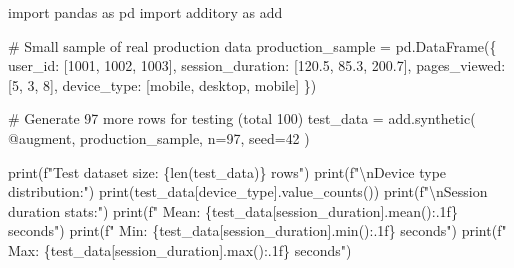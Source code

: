 \documentclass[
  letterpaper,
]{scrbook}
\newenvironment{Shaded}{\begin{snugshade}}{\end{snugshade}}
\newcommand{\BuiltInTok}[1]{\textcolor[rgb]{0.00,0.23,0.31}{#1}}
\newcommand{\CharTok}[1]{\textcolor[rgb]{0.13,0.47,0.30}{#1}}
\newcommand{\CommentTok}[1]{\textcolor[rgb]{0.37,0.37,0.37}{#1}}
\newcommand{\DecValTok}[1]{\textcolor[rgb]{0.68,0.00,0.00}{#1}}
\newcommand{\FloatTok}[1]{\textcolor[rgb]{0.68,0.00,0.00}{#1}}
\newcommand{\ImportTok}[1]{\textcolor[rgb]{0.00,0.46,0.62}{#1}}
\newcommand{\NormalTok}[1]{\textcolor[rgb]{0.00,0.23,0.31}{#1}}
\newcommand{\OperatorTok}[1]{\textcolor[rgb]{0.37,0.37,0.37}{#1}}
\newcommand{\SpecialCharTok}[1]{\textcolor[rgb]{0.37,0.37,0.37}{#1}}
\newcommand{\SpecialStringTok}[1]{\textcolor[rgb]{0.13,0.47,0.30}{#1}}
\newcommand{\StringTok}[1]{\textcolor[rgb]{0.13,0.47,0.30}{#1}}
\begin{document}
\begin{Shaded}
\begin{Highlighting}[]
\ImportTok{import}\NormalTok{ pandas }\ImportTok{as}\NormalTok{ pd}
\ImportTok{import}\NormalTok{ additory }\ImportTok{as}\NormalTok{ add}

\CommentTok{\# Small sample of real production data}
\NormalTok{production\_sample }\OperatorTok{=}\NormalTok{ pd.DataFrame(\{}
    \StringTok{\textquotesingle{}user\_id\textquotesingle{}}\NormalTok{: [}\DecValTok{1001}\NormalTok{, }\DecValTok{1002}\NormalTok{, }\DecValTok{1003}\NormalTok{],}
    \StringTok{\textquotesingle{}session\_duration\textquotesingle{}}\NormalTok{: [}\FloatTok{120.5}\NormalTok{, }\FloatTok{85.3}\NormalTok{, }\FloatTok{200.7}\NormalTok{],}
    \StringTok{\textquotesingle{}pages\_viewed\textquotesingle{}}\NormalTok{: [}\DecValTok{5}\NormalTok{, }\DecValTok{3}\NormalTok{, }\DecValTok{8}\NormalTok{],}
    \StringTok{\textquotesingle{}device\_type\textquotesingle{}}\NormalTok{: [}\StringTok{\textquotesingle{}mobile\textquotesingle{}}\NormalTok{, }\StringTok{\textquotesingle{}desktop\textquotesingle{}}\NormalTok{, }\StringTok{\textquotesingle{}mobile\textquotesingle{}}\NormalTok{]}
\NormalTok{\})}

\CommentTok{\# Generate 97 more rows for testing (total 100)}
\NormalTok{test\_data }\OperatorTok{=}\NormalTok{ add.synthetic(}
    \StringTok{\textquotesingle{}@augment\textquotesingle{}}\NormalTok{,}
\NormalTok{    production\_sample,}
\NormalTok{    n}\OperatorTok{=}\DecValTok{97}\NormalTok{,}
\NormalTok{    seed}\OperatorTok{=}\DecValTok{42}
\NormalTok{)}

\BuiltInTok{print}\NormalTok{(}\SpecialStringTok{f"Test dataset size: }\SpecialCharTok{\{}\BuiltInTok{len}\NormalTok{(test\_data)}\SpecialCharTok{\}}\SpecialStringTok{ rows"}\NormalTok{)}
\BuiltInTok{print}\NormalTok{(}\SpecialStringTok{f"}\CharTok{\textbackslash{}n}\SpecialStringTok{Device type distribution:"}\NormalTok{)}
\BuiltInTok{print}\NormalTok{(test\_data[}\StringTok{\textquotesingle{}device\_type\textquotesingle{}}\NormalTok{].value\_counts())}
\BuiltInTok{print}\NormalTok{(}\SpecialStringTok{f"}\CharTok{\textbackslash{}n}\SpecialStringTok{Session duration stats:"}\NormalTok{)}
\BuiltInTok{print}\NormalTok{(}\SpecialStringTok{f"  Mean: }\SpecialCharTok{\{}\NormalTok{test\_data[}\StringTok{\textquotesingle{}session\_duration\textquotesingle{}}\NormalTok{]}\SpecialCharTok{.}\NormalTok{mean()}\SpecialCharTok{:.1f\}}\SpecialStringTok{ seconds"}\NormalTok{)}
\BuiltInTok{print}\NormalTok{(}\SpecialStringTok{f"  Min: }\SpecialCharTok{\{}\NormalTok{test\_data[}\StringTok{\textquotesingle{}session\_duration\textquotesingle{}}\NormalTok{]}\SpecialCharTok{.}\BuiltInTok{min}\NormalTok{()}\SpecialCharTok{:.1f\}}\SpecialStringTok{ seconds"}\NormalTok{)}
\BuiltInTok{print}\NormalTok{(}\SpecialStringTok{f"  Max: }\SpecialCharTok{\{}\NormalTok{test\_data[}\StringTok{\textquotesingle{}session\_duration\textquotesingle{}}\NormalTok{]}\SpecialCharTok{.}\BuiltInTok{max}\NormalTok{()}\SpecialCharTok{:.1f\}}\SpecialStringTok{ seconds"}\NormalTok{)}
\end{Highlighting}
\end{Shaded}
\end{document}
